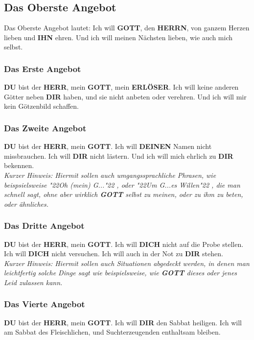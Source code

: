 \documentclass[10pt,a5paper]{article}
\newcommand{\Deinen}[0]{\textbf{DEINEN}}
\newcommand{\Dich}[0]{\textbf{DICH}}
\newcommand{\Dir}[0]{\textbf{DIR}}
\newcommand{\Du}[0]{\textbf{DU}}
\newcommand{\Erloeser}[0]{\textbf{ERL\"OSER}}
\newcommand{\Gott}[0]{\textbf{GOTT}}
\newcommand{\Herrn}[0]{\textbf{HERRN}}
\newcommand{\Herr}[0]{\textbf{HERR}}
\newcommand{\Ihn}[0]{\textbf{IHN}}
\newcommand{\q}[1]{\char"22{#1}\char"22 }
\begin{document}
	\subsection{Das Oberste Angebot}
		Das Oberste Angebot lautet:
		Ich will {\Gott}, den {\Herrn}, von ganzem Herzen lieben und {\Ihn} ehren. Und ich will meinen N\"achsten lieben, wie auch mich selbst.
		
	\subsubsection{Das Erste Angebot}
		{\Du} bist der {\Herr},
		mein {\Gott},
		mein {\Erloeser}.
		Ich will keine anderen G\"otter neben {\Dir} haben,
		und sie nicht anbeten oder verehren.
		Und ich will mir kein G\"otzenbild schaffen.
		
	\subsubsection{Das Zweite Angebot}
		{\Du} bist der {\Herr},
		mein {\Gott}.
		Ich will {\Deinen} Namen nicht missbrauchen.
		Ich will {\Dir} nicht l\"astern.
		Und ich will mich ehrlich zu {\Dir} bekennen.
		\\
		\textit{Kurzer Hinweis:
		Hiermit sollen auch umgangssprachliche Phrasen,
		wie beispsielsweise \q{Oh (mein) G...},
		oder \q{Um G...es Willen},
		die man schnell sagt,
		ohne aber wirklich {\Gott} selbst zu meinen,
		oder zu ihm zu beten,
		oder \"ahnliches.}
			
	\subsubsection{Das Dritte Angebot}
		{\Du} bist der {\Herr},
		mein {\Gott}.
		Ich will {\Dich} nicht auf die Probe stellen.
		Ich will {\Dich} nicht versuchen.
		Ich will auch in der Not zu {\Dir} stehen.
		\\
		\textit{Kurzer Hinweis:
		Hiermit sollen auch Situationen abgedeckt werden,
		in denen man leichtfertig solche Dinge sagt wie beispielsweise,
		wie {\Gott} dieses oder jenes Leid zulassen kann.}
		
	\subsubsection{Das Vierte Angebot}
		{\Du} bist der {\Herr},
		mein {\Gott}.
		Ich will {\Dir} den Sabbat heiligen.
		Ich will am Sabbat des Fleischlichen,
		und Suchterzeugenden enthaltsam bleiben.
		
\end{document}
